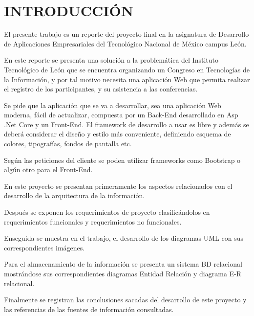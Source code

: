 \chapter*{INTRODUCCIÓN}
El presente trabajo es un reporte del proyecto final en la asignatura de Desarrollo de Aplicaciones Empresariales del Tecnológico Nacional de México campus León.

En este reporte se presenta una solución a la problemática del Instituto Tecnológico de León que se encuentra organizando un Congreso en Tecnologías de la Información, y por tal motivo necesita una aplicación Web que permita realizar el registro de los participantes, y su asistencia a las conferencias.  

Se pide que la aplicación que se va a desarrollar, sea una aplicación Web moderna, fácil de actualizar, compuesta por un Back-End desarrollado en Asp .Net Core y un Front-End. El framework de desarrollo a usar es libre y además se deberá considerar el diseño y estilo más conveniente, definiendo esquema de colores, tipografías, fondos de pantalla etc. 

Según las peticiones del cliente se poden utilizar frameworks como Bootstrap o algún otro para el Front-End.

En este proyecto se presentan primeramente los aspectos relacionados con el desarrollo de la arquitectura de la información.

Después se exponen los requerimientos de proyecto clasificándolos en requerimientos funcionales y requerimientos no funcionales.

Enseguida se muestra en el trabajo, el desarrollo de los diagramas UML con sus correspondientes imágenes.

Para el almacenamiento de la información se presenta un sistema BD relacional mostrándose sus correspondientes diagramas Entidad Relación y diagrama E-R relacional.

Finalmente se registran las conclusiones sacadas del desarrollo de este proyecto y las referencias de las fuentes de información consultadas.

